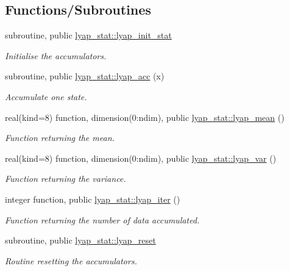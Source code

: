 \subsection*{Functions/\+Subroutines}
\begin{DoxyCompactItemize}
\item 
subroutine, public \hyperlink{namespacelyap__stat_a0db1853a990b21e68d094e08e9786271}{lyap\+\_\+stat\+::lyap\+\_\+init\+\_\+stat}
\begin{DoxyCompactList}\small\item\em Initialise the accumulators. \end{DoxyCompactList}\item 
subroutine, public \hyperlink{namespacelyap__stat_ae5925eda9d281c9f5d3b5bf51a342d75}{lyap\+\_\+stat\+::lyap\+\_\+acc} (x)
\begin{DoxyCompactList}\small\item\em Accumulate one state. \end{DoxyCompactList}\item 
real(kind=8) function, dimension(0\+:ndim), public \hyperlink{namespacelyap__stat_a05e8e9da3a46e83279e088b44f940d6e}{lyap\+\_\+stat\+::lyap\+\_\+mean} ()
\begin{DoxyCompactList}\small\item\em Function returning the mean. \end{DoxyCompactList}\item 
real(kind=8) function, dimension(0\+:ndim), public \hyperlink{namespacelyap__stat_a74c10391cac36f4ea668a2ab24047eca}{lyap\+\_\+stat\+::lyap\+\_\+var} ()
\begin{DoxyCompactList}\small\item\em Function returning the variance. \end{DoxyCompactList}\item 
integer function, public \hyperlink{namespacelyap__stat_a455a24b2f34307a219de05297857d216}{lyap\+\_\+stat\+::lyap\+\_\+iter} ()
\begin{DoxyCompactList}\small\item\em Function returning the number of data accumulated. \end{DoxyCompactList}\item 
subroutine, public \hyperlink{namespacelyap__stat_a464af579adb8b49dcd16abc1e251e1bc}{lyap\+\_\+stat\+::lyap\+\_\+reset}
\begin{DoxyCompactList}\small\item\em Routine resetting the accumulators. \end{DoxyCompactList}\end{DoxyCompactItemize}
